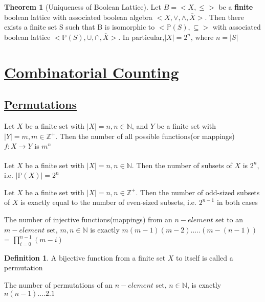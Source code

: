 \documentclass{article}
\theoremstyle{definition}
\newtheorem*{defi}{Definition}
\theoremstyle{definition}
\newenvironment{manualprop}[1]{%
  \renewcommand\themanualpropinner{#1}%
  \manualpropinner
}{\endmanualpropinner}
\newenvironment{manualcoro}[1]{%
  \renewcommand\themanualcoroinner{#1}%
  \manualcoroinner
}{\endmanualcoroinner}
\theoremstyle{named}
\newtheorem*{namedtheorem}{Theorem}
\begin{document}
\begin{namedtheorem}[Uniqueness of Boolean Lattice]
Let $B = <X, \leq>$ be a \textbf{finite} boolean lattice with associated boolean algebra $<X, \vee, \wedge, \overline{X}>$. Then there exists a finite set S such that B is isomorphic to $<\mathbb{P}(S), \subseteq>$ with associated boolean lattice $<\mathbb{P}(S), \cup, \cap, \overline{X}>$. In particular,$|X| = 2^n$, where $n = |S|$
\end{namedtheorem}


\section{\underline{Combinatorial Counting}}
\subsection{\underline{Permutations}}
\begin{manualprop}{14}
Let $X$ be a finite set with $|X| = n, n \in \mathbb{N}$, and $Y$ be a finite set with $|Y| = m, m \in \mathbb{Z^{+}}$. Then the number of all possible functions(or mappings) $f: X \xrightarrow[]{} Y$ is $m^n$
\end{manualprop}

\begin{manualcoro}{14.1}
Let $X$ be a finite set with $|X| = n, n \in \mathbb{N}$. Then the number of subsets of $X$ is $2^n$, i.e. $|\mathbb{P}(X)| = 2^n$
\end{manualcoro}


\begin{manualcoro}{14.2}
Let $X$ be a finite set with $|X| = n, n \in \mathbb{Z^{+}}$. Then the number of odd-sized subsets of $X$ is exactly equal to the number of even-sized subsets, i.e. $2^{n-1}$ in both cases
\end{manualcoro}

\begin{manualprop}{15}
The number of injective functions(mappings) from an $n-element$ set to an $m-element$ set, $m, n \in \mathbb{N}$ is exactly $m(m-1)(m-2).....(m-(n-1))$ = $\prod_{i = 0}^{n-1} (m-i)$
\end{manualprop}

\begin{defi}
A bijective function from a finite set $X$ to itself is called a permutation
\end{defi}

\begin{manualprop}{16}
The number of permutations of an $n-element$ set, $n \in \mathbb{N}$, is exactly $n(n-1)....2.1$
\end{manualprop}
\end{document}
